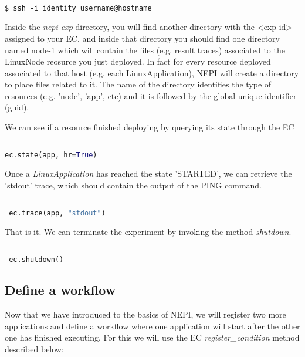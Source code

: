 \begingroup
    \fontsize{10pt}{12pt}\selectfont

\begin{verbatim}

$ ssh -i identity username@hostname

\end{verbatim}

\endgroup

Inside the \emph{nepi-exp} directory, you will find another directory with 
the <exp-id> assigned to your EC, and inside that directory you should find 
one directory named node-1 which will contain the files (e.g. result traces) 
associated to the LinuxNode reosurce you just deployed. 
In fact for every resource deployed associated to that host (e.g. each 
LinuxApplication), NEPI will create a directory to place files related to it. 
The name of the directory identifies the type of resources (e.g. 'node', 
'app', etc) and it is followed by the global unique identifier (guid).

We can see if a resource finished deploying by querying its state through the EC 

\begin{lstlisting}[language=Python]

ec.state(app, hr=True)

\end{lstlisting}

Once a \textit{LinuxApplication} has reached the state 'STARTED', 
we can retrieve the 'stdout' trace, which should contain the output 
of the PING command. 

\begin{lstlisting}[language=Python]

 ec.trace(app, "stdout")

\end{lstlisting}

That is it. We can terminate the experiment by invoking the method \emph{shutdown}.

\begin{lstlisting}[language=Python]

 ec.shutdown()

\end{lstlisting}

\subsection{Define a workflow}

Now that we have introduced to the basics of NEPI, we will register 
two more applications and define a workflow where one application 
will start after the other one has finished executing. 
For this we will use the EC \textit{register\_condition} method described below:

